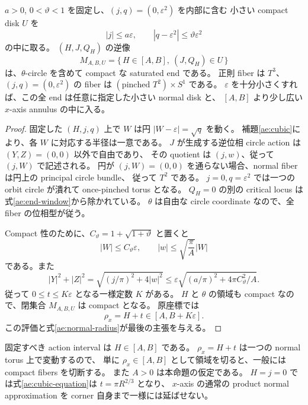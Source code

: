 \begin{proposition}\label{ae:compact-end}
$a>0$, $0<\vartheta<1$ を固定し、$(j,q)=(0,\varepsilon^2)$ を内部に含む
小さい compact disk $U$ を
\begin{equation}\label{ae:end-window}
 |j|\le a\varepsilon,\qquad |q-\varepsilon^2|\le\vartheta\varepsilon^2
\end{equation}
の中に取る。
$(H,J,Q_H)$ の逆像
\[
 M_{A,B,U}=\{\,H\in[A,B],\ (J,Q_H)\in U\,\}
\]
は、$\theta$-circle を含めて compact な saturated end である。
正則 fiber は $T^3$、$(j,q)=(0,\varepsilon^2)$ の fiber は
$(\text{pinched }T^2)\times S^1$ である。
$\varepsilon$ を十分小さくすれば、この全 end は任意に指定した小さい normal disk と、
$[A,B]$ より少し広い $x$-axis annulus の中に入る。
\end{proposition}

\begin{proof}
固定した $(H,j,q)$ 上で $W$ は円 $|W-\varepsilon|=\sqrt q$ を動く。
補題\ref{ae:cubic}により、各 $W$ に対応する半径は一意である。
$J$ が生成する逆位相 circle action は $(Y,Z)=(0,0)$ 以外で自由であり、
その quotient は $(j,w)$、従って $(j,W)$ で記述される。
円が $(j,W)=(0,0)$ を通らない場合、normal fiber は円上の principal circle bundle、
従って $T^2$ である。
$j=0,q=\varepsilon^2$ では一つの orbit circle が潰れて once-pinched torus となる。
$Q_H=0$ の別の critical locus は式\eqref{ae:end-window}から除かれている。
$\theta$ は自由な circle coordinate なので、全 fiber の位相型が従う。

Compact 性のために、$C_\vartheta=1+\sqrt{1+\vartheta}$ と置くと
\[
 |W|\le C_\vartheta\varepsilon,\qquad
 |w|\le\sqrt{\frac\pi A}|W|
\]
である。また
\begin{equation}\label{ae:normal-radius}
 |Y|^2+|Z|^2
 =\sqrt{(j/\pi)^2+4|w|^2}
 \le\varepsilon\sqrt{(a/\pi)^2+4\pi C_\vartheta^2/A}.
\end{equation}
従って $0\le t\le K\varepsilon$ となる一様定数 $K$ がある。
$H$ と $\theta$ の領域も compact なので、閉集合 $M_{A,B,U}$ は compact となる。
原座標では
\begin{equation}\label{ae:x-radius}
 \rho_x=H+t\in[A,B+K\varepsilon].
\end{equation}
この評価と式\eqref{ae:normal-radius}が最後の主張を与える。
\end{proof}

\begin{remark}\label{ae:saturated-warning}
固定すべき action interval は $H\in[A,B]$ である。
$\rho_x=H+t$ は一つの normal torus 上で変動するので、
単に $\rho_x\in[A,B]$ として領域を切ると、一般には compact fibers を切断する。
また $A>0$ は本命題の仮定である。
$H=j=0$ では式\eqref{ae:cubic-equation}は $t=\pi R^{2/3}$ となり、
$x$-axis の通常の product normal approximation を corner 自身まで一様には延ばせない。
\end{remark}

